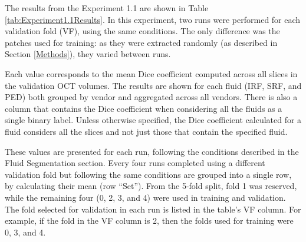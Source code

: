 The results from the Experiment 1.1 are shown in Table \ref{tab:Experiment1.1Results}. In this experiment, two runs were performed for each validation fold (VF), using the same conditions. The only difference was the patches used for training: as they were extracted randomly (as described in Section \ref{Methods}), they varied between runs. 
\par
Each value corresponds to the mean Dice coefficient computed across all slices in the validation OCT volumes. The results are shown for each fluid (IRF, SRF, and PED) both grouped by vendor and aggregated across all vendors. There is also a column that contains the Dice coefficient when considering all the fluids as a single binary label. Unless otherwise specified, the Dice coefficient calculated for a fluid considers all the slices and not just those that contain the specified fluid. 
\par
These values are presented for each run, following the conditions described in the Fluid Segmentation section. Every four runs completed using a different validation fold but following the same conditions are grouped into a single row, by calculating their mean (row ``Set''). From the 5-fold split, fold 1 was reserved, while the remaining four (0, 2, 3, and 4) were used in training and validation. The fold selected for validation in each run is listed in the table's VF column. For example, if the fold in the VF column is 2, then the folds used for training were 0, 3, and 4.

